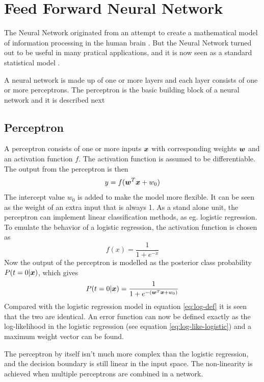 \section{Feed Forward Neural Network}\label{sec:feed-forward-neural-network}
The Neural Network originated from an attempt to create a mathematical model of information processing in the human brain \citep[p.226]{bishop}. But the Neural Network turned out to be useful in many pratical applications, and it is now seen as a standard statistical model \citep[p.392]{hastie09}. \par
A neural network is made up of one or more layers and each layer consists of one or more perceptrons. The perceptron is the basic building block of a neural network and it is described next

\subsection{Perceptron}
A perceptron consists of one or more inputs $\boldsymbol{x}$ with corresponding weights $\boldsymbol{w}$ and an activation function $f$. The activation function is assumed to be differentiable. The output from the perceptron is then
\[
    y = f(\boldsymbol{w}^T\boldsymbol{x} + w_0)
\]
The intercept value $w_0$ is added to make the model more flexible. It can be seen as the weight of an extra input that is always 1.
As a stand alone unit, the perceptron can implement linear classification methods, as eg. logistic regression. To emulate the behavior of a logistic regression, the activation function is chosen as
\[
    f(x) = \frac{1}{1+e^{-x}}
\]
Now the output of the perceptron is modelled as the posterior class probability $P(t=0|\boldsymbol{x})$, which gives
\[
    P(t=0|\boldsymbol{x}) = \frac{1}{1+e^{-(\boldsymbol{w}^T\boldsymbol{x}+w_0)}}
\]
Compared with the logistic regression model in equation \eqref{eq:log-def} it is seen that the two are identical. An error function can now be defined exactly as the log-likelihood in the logistic regression (see equation \eqref{eq:log-like-logistic}) and a maximum weight vector can be found. \par
The perceptron by itself isn't much more complex than the logistic regression, and the decision boundary is still linear in the input space. The non-linearity is achieved when multiple perceptrons are combined in a network.

